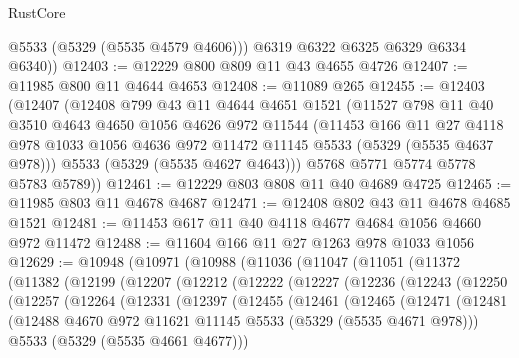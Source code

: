 \begin{lexlean}{RustCore}
\begin{coremodule}
          @5533
          (@5329 (@5535 @4579 @4606)))
        @6319
        @6322
        @6325
        @6329
        @6334
        @6340))
@12403 := @12229 @800 @809 @11 @43 @4655 @4726
@12407 := @11985 @800 @11 @4644 @4653
@12408 := @11089 @265
@12455 := @12403
    (@12407
      (@12408
        @799
        @43
        @11
        @4644
        @4651
        @1521
        (@11527
          @798
          @11
          @40
          @3510
          @4643
          @4650
          @1056
          @4626
          @972
          @11544
          (@11453
            @166
            @11
            @27
            @4118
            @978
            @1033
            @1056
            @4636
            @972
            @11472
            @11145
            @5533
            (@5329 (@5535 @4637 @978)))
          @5533
          (@5329 (@5535 @4627 @4643)))
        @5768
        @5771
        @5774
        @5778
        @5783
        @5789))
@12461 := @12229 @803 @808 @11 @40 @4689 @4725
@12465 := @11985 @803 @11 @4678 @4687
@12471 := @12408 @802 @43 @11 @4678 @4685 @1521
@12481 := @11453 @617 @11 @40 @4118 @4677 @4684 @1056 @4660 @972 @11472
@12488 := @11604 @166 @11 @27 @1263 @978 @1033 @1056
@12629 := @10948
    (@10971
      (@10988
        (@11036
          (@11047
            (@11051
              (@11372
                (@11382
                  (@12199
                    (@12207
                      (@12212
                        (@12222
                          (@12227
                            (@12236
                              (@12243
                                (@12250
                                  (@12257
                                    (@12264
                                      (@12331
                                        (@12397
                                          (@12455
                                            (@12461
                                              (@12465
                                                (@12471
                                                  (@12481
                                                    (@12488
                                                      @4670
                                                      @972
                                                      @11621
                                                      @11145
                                                      @5533
                                                      (@5329 (@5535 @4671 @978)))
                                                    @5533
                                                    (@5329 (@5535 @4661 @4677)))

\end{coremodule}
\end{lexlean}
